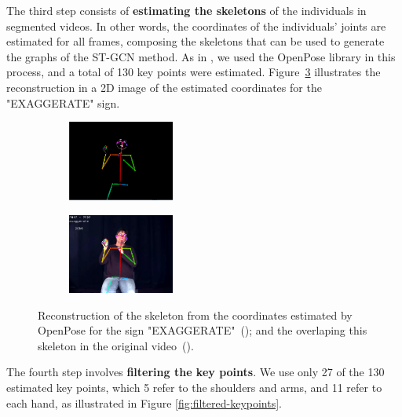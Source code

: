 The third step consists of \textbf{estimating the skeletons} of the individuals in segmented videos. In other words, the coordinates of the individuals' joints are estimated for all frames, composing the skeletons that can be used to generate the graphs of the ST-GCN method. As in \cite {st-gcn-2018}, we used the OpenPose library in this process, and a total of 130 key points were estimated. Figure~\ref{fig:sign-pose} illustrates the reconstruction in a 2D image of the estimated coordinates for the "EXAGGERATE" sign. 

\begin{figure}
    \centering
    \begin{subfigure}{3.5cm}
        \centering
        \includegraphics[width=3.5cm]{images/sign_pose}
        \caption{}
        \label{fig:sign-pose-skeleton}
    \end{subfigure}
    \begin{subfigure}{3.5cm}
      \centering
      \includegraphics[width=3.5cm]{images/sign_pose_blended}
      \caption{}
      \label{fig:sign-pose-blended}
    \end{subfigure}
    \caption{
        Reconstruction of the skeleton from the coordinates estimated by OpenPose for the sign "EXAGGERATE"~(); and the overlaping this skeleton in the original video~().
    }
    \label{fig:sign-pose}
\end{figure}

The fourth step involves \textbf{filtering the key points}. We use only 27 of the 130 estimated key points, which 5 refer to the shoulders and arms, and 11 refer to each hand, as illustrated in Figure \ref{fig:filtered-keypoints}. 

